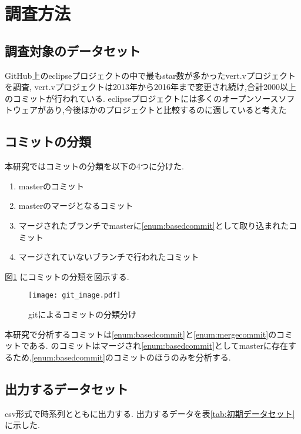 \documentclass{fose2016}           %
\begin{document}
\section{調査方法}\label{調査方法}

\subsection{調査対象のデータセット}
GitHub上のeclipseプロジェクトの中で最もstar数が多かったvert.vプロジェクトを調査,
vert.vプロジェクトは2013年から2016年まで変更され続け,合計2000以上のコミットが行われている.
eclipseプロジェクトには多くのオープンソースソフトウェアがあり,今後ほかのプロジェクトと比較するのに適していると考えた

\subsection{コミットの分類}
本研究ではコミットの分類を以下の4つに分けた.

\begin{enumerate}
\item masterのコミット \label{enum:basedcommit}
\item masterのマージとなるコミット \label{enum:mergecommit}
\item マージされたブランチでmasterに\ref{enum:basedcommit}として取り込まれたコミット \label{enum:mergedbranch}
\item マージされていないブランチで行われたコミット
\end{enumerate}

図\ref{fig:gitimage} にコミットの分類を図示する.

\begin{figure}[t]
\centering
\texttt{[image: git\_image.pdf]}
\caption{gitによるコミットの分類分け}
\label{fig:gitimage} 
\end{figure}

本研究で分析するコミットは\ref{enum:basedcommit}と\ref{enum:mergecommit}のコミットである.
\label{enum:mergedbranch}のコミットはマージされ\ref{enum:basedcommit}としてmasterに存在するため,\ref{enum:basedcommit}のコミットのほうのみを分析する.

\subsection{出力するデータセット}
csv形式で時系列とともに出力する.
出力するデータを表\ref{tab:初期データセット}に示した.
\end{document}
